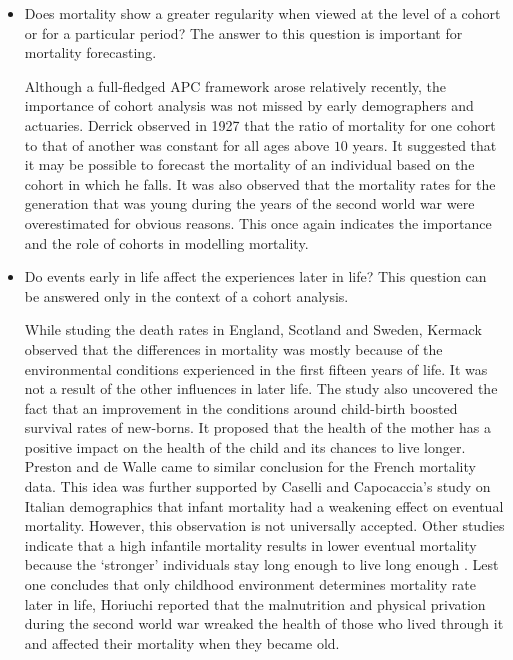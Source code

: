 \documentclass{article}
\numberwithin{equation}{section}
\begin{document}
\begin{itemize}
\item Does mortality show a greater regularity when viewed at the level of a
cohort or for a particular period? The answer to this question is important
for mortality forecasting.

Although a full-fledged APC framework arose relatively recently, the importance
of cohort analysis was not missed by early demographers and actuaries. Derrick
\cite{derrick1927observations} observed in 1927 that the ratio of mortality
for one cohort to that of another was constant for all ages above $10$ years.
It suggested that it may be possible to forecast the mortality of an individual
based on the cohort in which he falls. It was also observed that the mortality
rates for the generation that was young during the years of the second world
war were overestimated for obvious reasons. This once again indicates the 
importance and the role of cohorts in modelling mortality. 

\item Do events early in life affect the experiences later in life? This 
question can be answered only in the context of a cohort analysis.

While studing the death rates in England, Scotland and Sweden, Kermack
\cite{kermack1934death} observed that the differences in mortality was mostly
because of the environmental conditions experienced in the first fifteen years
of life. It was not a result of the other influences in later life. The 
study also uncovered the fact that an improvement in the conditions around
child-birth boosted survival rates of new-borns. It proposed that the health
of the mother has a positive impact on the health of the child and its chances
to live longer. Preston and de Walle \cite{preston1978urban} came to similar
conclusion for the French mortality data. This idea was further supported by 
Caselli and Capocaccia's study\cite{caselli1989age} on Italian demographics 
that infant mortality had a weakening effect on eventual mortality. However, 
this observation is not universally accepted. Other studies indicate that a 
high infantile mortality results in lower eventual mortality because the 
`stronger' individuals stay long enough to live long enough 
\cite{manton1981methods}. Lest one concludes that only childhood environment
determines mortality rate later in life, Horiuchi reported 
\cite{horiuchi1983long} that the malnutrition and physical privation during the
second world war wreaked the health of those who lived through it and affected
their mortality when they became old.
\end{itemize}
\end{document}
